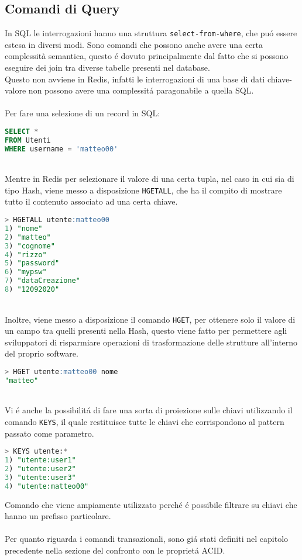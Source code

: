 \subsection{Comandi di Query}
In SQL le interrogazioni hanno una struttura \texttt{select-from-where}, che puó essere estesa in diversi modi. Sono comandi
che possono anche avere una certa complessità semantica, questo é dovuto principalmente dal fatto che si possono eseguire dei join
tra diverse tabelle presenti nel database.\\
Questo non avviene in Redis, infatti le interrogazioni di una base di dati chiave-valore non possono avere una complessitá paragonabile a quella SQL.\\
\\
Per fare una selezione di un record in SQL:
\begin{lstlisting}[autogobble,style=redis-cli, language=SQL]
SELECT *
FROM Utenti
WHERE username = 'matteo00'\end{lstlisting}
\\
Mentre in Redis per selezionare il valore di una certa tupla, nel caso in cui sia di tipo Hash, viene messo a disposizione \texttt{HGETALL}, che ha il compito di mostrare tutto
il contenuto associato ad una certa chiave.
\begin{lstlisting}[autogobble, style=redis-cli, language=SQL]
> HGETALL utente:matteo00
1) "nome"
2) "matteo"
3) "cognome"
4) "rizzo"
5) "password"
6) "mypsw"
7) "dataCreazione"
8) "12092020"
\end{lstlisting}
\\
Inoltre, viene messo a disposizione il comando \texttt{HGET}, per ottenere solo il valore di un campo tra quelli presenti nella Hash, questo viene fatto per permettere
agli sviluppatori di risparmiare operazioni di trasformazione delle strutture all'interno del proprio software.
\begin{lstlisting}[autogobble, style=redis-cli, language=SQL]
> HGET utente:matteo00 nome
"matteo"
\end{lstlisting}
\\
Vi é anche la possibilitá di fare una sorta di proiezione sulle chiavi utilizzando il comando \texttt{KEYS}, il quale restituisce tutte le chiavi che corrispondono al pattern passato come parametro.
\begin{lstlisting}[autogobble, style=redis-cli, language=SQL]
> KEYS utente:*
1) "utente:user1"
2) "utente:user2"
3) "utente:user3"
4) "utente:matteo00"
\end{lstlisting}
Comando che viene ampiamente utilizzato perché é possibile filtrare su chiavi che hanno un prefisso particolare.\\
\\
Per quanto riguarda i comandi transazionali, sono giá stati definiti nel capitolo precedente nella sezione del confronto con le proprietá ACID.

